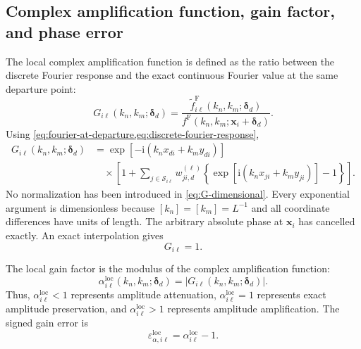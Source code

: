\documentclass[11pt]{article}
\numberwithin{equation}{section}
\newcommand{\ii}{\mathrm{i}}
\begin{document}
\subsection{Complex amplification function, gain factor, and phase error}

The local complex amplification function is defined as the ratio between the discrete Fourier response and the exact continuous Fourier value at the same departure point:
\begin{equation}
    \boxed{
    G_{i\ell}\!\left(k_n,k_m;\bm{\delta}_d\right)
    =
    \frac{
        \widetilde f^{\mathrm F}_{i\ell}
        \!\left(k_n,k_m;\bm{\delta}_d\right)
    }{
        f^{\mathrm F}\!\left(k_n,k_m;\bm{x}_i+\bm{\delta}_d\right)
    }.
    }
    \label{eq:G-definition}
\end{equation}
Using \cref{eq:fourier-at-departure,eq:discrete-fourier-response},
\begin{equation}
\boxed{
\begin{aligned}
    G_{i\ell}\!\left(k_n,k_m;\bm{\delta}_d\right)
    &=
    \exp\!\left[-\ii\left(k_nx_{di}+k_my_{di}\right)\right]
    \\
    &\quad\times
    \left[
        1+
        \sum_{j\in\mathcal S_{i\ell}}
        w_{ji,d}^{(\ell)}
        \left\{
            \exp\!\left[\ii\left(k_nx_{ji}+k_my_{ji}\right)\right]-1
        \right\}
    \right].
\end{aligned}
}
\label{eq:G-dimensional}
\end{equation}
No normalization has been introduced in \cref{eq:G-dimensional}. Every exponential argument is dimensionless because $[k_n]=[k_m]=L^{-1}$ and all coordinate differences have units of length. The arbitrary absolute phase at $\bm{x}_i$ has cancelled exactly. An exact interpolation gives
\begin{equation}
    G_{i\ell}=1.
    \label{eq:exact-G}
\end{equation}

The local gain factor is the modulus of the complex amplification function:
\begin{equation}
    \boxed{
    \alpha_{i\ell}^{\mathrm{loc}}
    \!\left(k_n,k_m;\bm{\delta}_d\right)
    =
    \left|
        G_{i\ell}\!\left(k_n,k_m;\bm{\delta}_d\right)
    \right|.
    }
    \label{eq:local-gain}
\end{equation}
Thus, $\alpha_{i\ell}^{\mathrm{loc}}<1$ represents amplitude attenuation, $\alpha_{i\ell}^{\mathrm{loc}}=1$ represents exact amplitude preservation, and $\alpha_{i\ell}^{\mathrm{loc}}>1$ represents amplitude amplification. The signed gain error is
\begin{equation}
    \varepsilon_{\alpha,i\ell}^{\mathrm{loc}}
    =
    \alpha_{i\ell}^{\mathrm{loc}}-1.
    \label{eq:signed-gain-error}
\end{equation}
\end{document}
